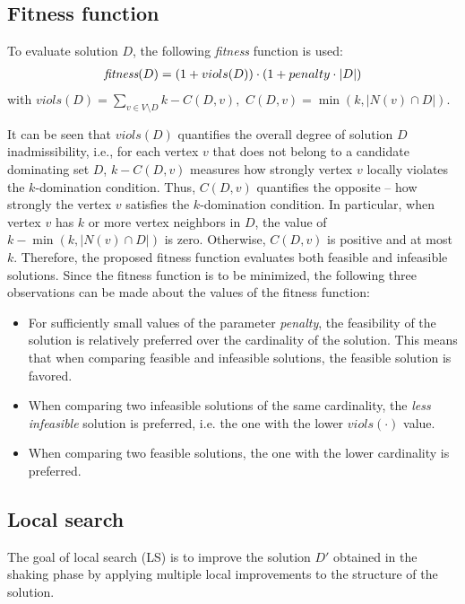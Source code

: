 \documentclass[dvipsnames,format=sigconf]{acmart} %
\begin{document}
\subsection{Fitness function}\label{subsec:fit}
   To evaluate solution $D$, the following   \emph{fitness} function is used:
   \begin{align}\label{eq:fitness}
      \emph{fitness}(D) = ( 1 + viols(D)) \cdot ( 1+ penalty \cdot |D|)
   \end{align}
   with   $viols(D) = \sum_{v \in V \setminus D}{k-C(D, v)},$  $C(D, v) = \min(k, |N(v) \cap D|)$.
   

It can be seen that $viols(D)$ quantifies the overall degree of solution $D$ inadmissibility, i.e., for each vertex $v$ that does not belong to a candidate dominating set $D$, $k-C(D, v)$ measures how strongly vertex $v$ locally violates the $k$-domination condition. Thus, $C(D, v)$ quantifies the opposite -- how strongly the vertex $v$ satisfies the $k$-domination condition. In particular, when vertex $v$ has $k$ or more vertex neighbors in $D$, the value of $k - \min(k, |N(v) \cap D|)$ is zero. Otherwise, $C(D, v)$ is positive and at most $k$. Therefore, the proposed fitness function evaluates both feasible and infeasible solutions. 
Since the fitness function is to be minimized, the following three observations can be made about the values of the fitness function:
\begin{itemize}
 		\item For sufficiently small values of the parameter \emph{penalty}, the feasibility of the solution is relatively preferred over the cardinality of the solution. This means that when comparing feasible and infeasible solutions, the feasible solution is favored. 
 
     	\item When comparing two infeasible solutions of the same cardinality, the \emph{less infeasible} solution is preferred, i.e. the one with the lower $viols(\cdot)$ value.  
        
        \item When comparing two feasible solutions, the one with the lower cardinality is preferred.
\end{itemize}

\subsection{Local search}\label{sec:local_search}
The goal of local search (LS) is to improve the solution $D'$ obtained in the shaking phase by applying multiple local improvements to the structure of the solution. 
\end{document}
